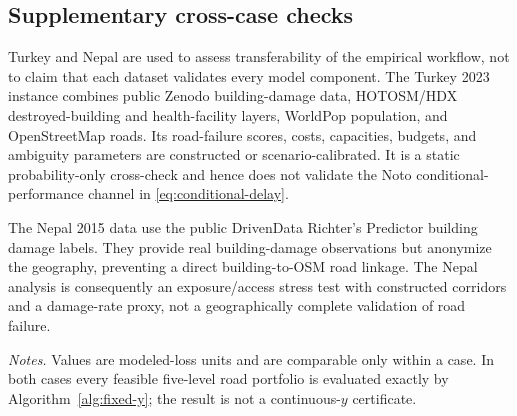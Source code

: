 \subsection{Supplementary cross-case checks}
\label{sec:cross-case}

Turkey and Nepal are used to assess transferability of the empirical
workflow, not to claim that each dataset validates every model component.
The Turkey 2023 instance combines public Zenodo building-damage data,
HOTOSM/HDX destroyed-building and health-facility layers, WorldPop
population, and OpenStreetMap roads. Its road-failure scores, costs,
capacities, budgets, and ambiguity parameters are constructed or
scenario-calibrated. It is a static probability-only cross-check and hence
does not validate the Noto conditional-performance channel in
\eqref{eq:conditional-delay}.

The Nepal 2015 data use the public DrivenData Richter's Predictor building
damage labels. They provide real building-damage observations but anonymize
the geography, preventing a direct building-to-OSM road linkage. The Nepal
analysis is consequently an exposure/access stress test with constructed
corridors and a damage-rate proxy, not a geographically complete validation
of road failure.

\begin{table}[t]
\centering
\caption{Supplementary exact-grid cross-case checks at \(\rho=0.10\).}
\label{tab:cross-case-results}
\small
{}
\par\smallskip
\footnotesize\textit{Notes.} Values are modeled-loss units and are
comparable only within a case. In both cases every feasible five-level road
portfolio is evaluated exactly by Algorithm~\ref{alg:fixed-y}; the result is
not a continuous-\(y\) certificate.
\end{table}

